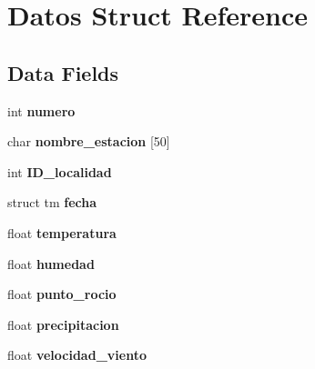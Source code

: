 \hypertarget{struct_datos}{}\section{Datos Struct Reference}
\label{struct_datos}
\subsection*{Data Fields}
\begin{DoxyCompactItemize}
\item 
int {\bfseries numero}\hypertarget{struct_datos_a2c30f43104974e72e2809fb4569804b0}{}\label{struct_datos_a2c30f43104974e72e2809fb4569804b0}

\item 
char {\bfseries nombre\+\_\+estacion} \mbox{[}50\mbox{]}\hypertarget{struct_datos_ad2c9680a715d614038dfc538e24d2865}{}\label{struct_datos_ad2c9680a715d614038dfc538e24d2865}

\item 
int {\bfseries I\+D\+\_\+localidad}\hypertarget{struct_datos_aa4a8845b58b83de48f93132f008e7756}{}\label{struct_datos_aa4a8845b58b83de48f93132f008e7756}

\item 
struct tm {\bfseries fecha}\hypertarget{struct_datos_afe486c34bd1b7505b25a9cc526aec350}{}\label{struct_datos_afe486c34bd1b7505b25a9cc526aec350}

\item 
float {\bfseries temperatura}\hypertarget{struct_datos_a8347aeb522c9e13e9f376640fad780e7}{}\label{struct_datos_a8347aeb522c9e13e9f376640fad780e7}

\item 
float {\bfseries humedad}\hypertarget{struct_datos_a34280c09711b9f4f72211e5c467b57bf}{}\label{struct_datos_a34280c09711b9f4f72211e5c467b57bf}

\item 
float {\bfseries punto\+\_\+rocio}\hypertarget{struct_datos_ab67358f4698862a2d475ac18e89dd00b}{}\label{struct_datos_ab67358f4698862a2d475ac18e89dd00b}

\item 
float {\bfseries precipitacion}\hypertarget{struct_datos_abc60df6e6dbfecbc25cfdffef13a4265}{}\label{struct_datos_abc60df6e6dbfecbc25cfdffef13a4265}

\item 
float {\bfseries velocidad\+\_\+viento}\hypertarget{struct_datos_a007ce1e7390c98b60077ab2c30201313}{}\label{struct_datos_a007ce1e7390c98b60077ab2c30201313}


\end{DoxyCompactItemize}
